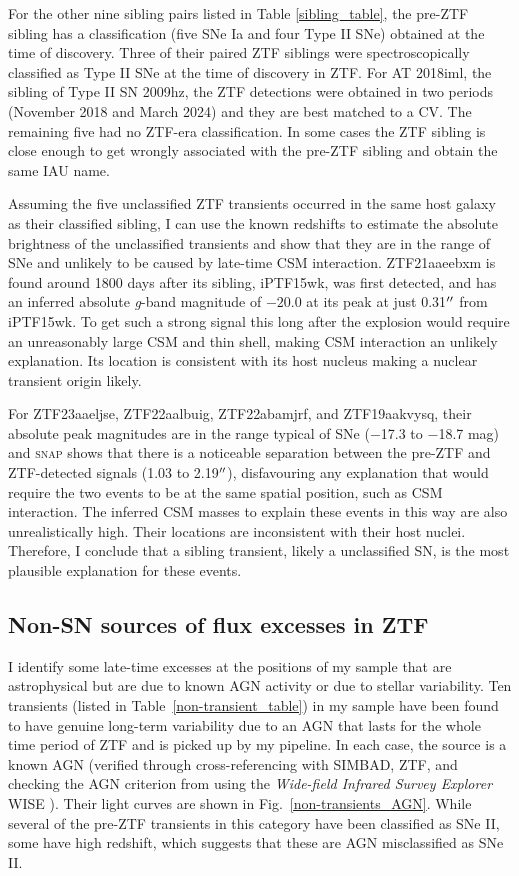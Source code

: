 \documentclass[a4paper,oneside,12pt, class=Latex/Classes/PhDthesisPSnPDF, crop=false]{standalone}
\begin{document}
For the other nine sibling pairs listed in Table \ref{sibling_table}, the pre-ZTF sibling has a classification (five SNe Ia and four Type II SNe) obtained at the time of discovery. Three of their paired ZTF siblings were spectroscopically classified as Type II SNe at the time of discovery in ZTF. For AT 2018iml, the sibling of Type II SN 2009hz, the ZTF detections were obtained in two periods (November 2018 and March 2024) and they are best matched to a CV. The remaining five had no ZTF-era classification. In some cases the ZTF sibling is close enough to get wrongly associated with the pre-ZTF sibling and obtain the same IAU name.

Assuming the five unclassified ZTF transients occurred in the same host galaxy as their classified sibling, I can use the known redshifts to estimate the absolute brightness of the unclassified transients and show that they are in the range of SNe and unlikely to be caused by late-time CSM interaction.
ZTF21aaeebxm is found around 1800 days after its sibling, iPTF15wk, was first detected, and has an inferred absolute \textit{g}-band magnitude of $-20.0$ at its peak at just 0.31$^{\prime\prime}$ from iPTF15wk. To get such a strong signal this long after the explosion would require an unreasonably large CSM and thin shell, making CSM interaction an unlikely explanation. Its location is consistent with its host nucleus making a nuclear transient origin likely.

For ZTF23aaeljse, ZTF22aalbuig, ZTF22abamjrf, and ZTF19aakvysq, their absolute peak magnitudes are in the range typical of SNe ($-$17.3 to $-$18.7 mag) and \textsc{snap} shows that there is a noticeable separation between the pre-ZTF and ZTF-detected signals (1.03 to 2.19$^{\prime\prime}$), disfavouring any explanation that would require the two events to be at the same spatial position, such as CSM interaction. The inferred CSM masses to explain these events in this way are also unrealistically high. Their locations are inconsistent with their host nuclei. Therefore, I conclude that a sibling transient, likely a unclassified SN, is the most plausible explanation for these events. 


\subsection{Non-SN sources of flux excesses in ZTF}
\label{non-sn}
I identify some late-time excesses at the positions of my sample that are astrophysical but are due to known AGN activity or due to stellar variability. Ten transients (listed in Table~\ref{non-transient_table}) in my sample have been found to have genuine long-term variability due to an AGN that lasts for the whole time period of ZTF and is picked up by my pipeline. In each case, the source is a known AGN (verified through cross-referencing with SIMBAD, ZTF, and checking the AGN criterion from \citealt{WISE_crit} using the \textit{Wide-field Infrared Survey Explorer} WISE \citealt{WISE}). Their light curves are shown in Fig.~\ref{non-transients_AGN}. While several of the pre-ZTF transients in this category have been classified as SNe II, some have high redshift, which suggests that these are AGN misclassified as SNe II.
\end{document}
